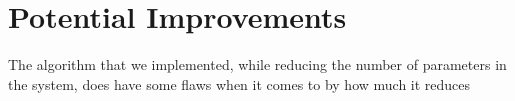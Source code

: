 \documentclass[oneside, a4paper, onecolumn, 11pt]{article}
\begin{document}
\section{Potential Improvements}

The algorithm that we implemented, while reducing the number of parameters in the system, does have some flaws when it comes to by how much it reduces

\newpage




\end{document}
